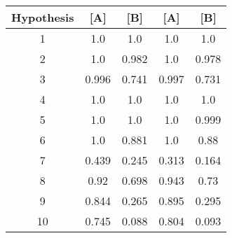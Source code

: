 \begin{tabular}{c|cccc}
Hypothesis & [A] & [B] & [A] & [B] \\
\hline
1 & 1.0 & 1.0 & 1.0 & 1.0 \\
2 & 1.0 & 0.982 & 1.0 & 0.978 \\
3 & 0.996 & 0.741 & 0.997 & 0.731 \\
4 & 1.0 & 1.0 & 1.0 & 1.0 \\
5 & 1.0 & 1.0 & 1.0 & 0.999 \\
6 & 1.0 & 0.881 & 1.0 & 0.88 \\
7 & 0.439 & 0.245 & 0.313 & 0.164 \\
8 & 0.92 & 0.698 & 0.943 & 0.73 \\
9 & 0.844 & 0.265 & 0.895 & 0.295 \\
10 & 0.745 & 0.088 & 0.804 & 0.093 \\
\end{tabular}